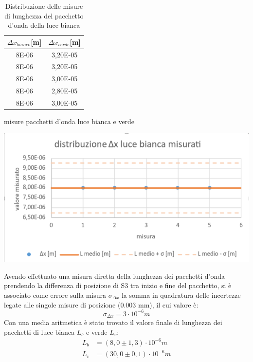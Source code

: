 \documentclass{article}
\begin{document}
    \begin{table}[H]
    \begin{minipage}[b]{0.35\linewidth}
        \centering
            \begin{tabular}{ cc } 
                \toprule 
                 $\Delta x_{bianco}$[m] & $\Delta x_{verde}$[m]  \\
                \midrule 
                8E-06	&	3,20E-05 \\
                8E-06	&	3,20E-05\\
                8E-06	&	3,00E-05\\
                8E-06	&	2,80E-05\\  
                8E-06	&	3,00E-05\\
                \bottomrule           
            \end{tabular}
            \caption{misure pacchetti d'onda luce bianca e verde}
            \label{misure: pacchetto d'onda luce bianca e verde}
        \end{minipage}
        \begin{minipage}[b]{0.65\linewidth}
                \centering
                \includegraphics[scale=0.3]{../images/luce_bianca.png}
                \caption{Distribuzione delle misure di lunghezza del pacchetto d'onda della luce bianca}
                \label{graph:luce bianca}
        \end{minipage}
        
        \end{table}
    Avendo effettuato una misura diretta della lunghezza dei pacchetti d'onda prendendo la differenza di posizione di S3 tra inizio e fine del pacchetto, si è associato come errore sulla misura $\sigma_{\Delta x}$ la somma in quadratura delle incertezze legate alle singole misure di posizione ($0.003$ mm), il cui valore è:
        \[\sigma_{\Delta x} = 3\cdot10^{-6} m \]
    Con una media aritmetica è stato trovato il valore finale di lunghezza dei pacchetti di luce bianca $L_b$ e verde $L_v$:
    \begin{align*}
        L_b &= (8,0 \pm 1,3)\cdot 10^{-6} m\\
        L_v &= (30,0 \pm 0,1)\cdot 10^{-6} m\\ 
    \end{align*}
        
\end{document}
